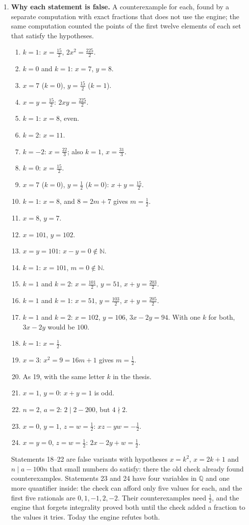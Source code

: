 \documentclass[11pt,a4paper]{article}
\begin{document}
\begin{enumerate}
\item \textbf{Why each statement is false.} A counterexample for each, found by a separate computation with exact fractions that does not use the engine; the same computation counted the points of the first twelve elements of each set that satisfy the hypotheses.
\begin{enumerate}
\item $k = 1$: $x = \frac{15}{2}$, $2x^{2} = \frac{225}{2}$.
\item $k = 0$ and $k = 1$: $x = 7$, $y = 8$.
\item $x = 7$ ($k = 0$), $y = \frac{15}{2}$ ($k = 1$).
\item $x = y = \frac{15}{2}$: $2xy = \frac{225}{2}$.
\item $k = 1$: $x = 8$, even.
\item $k = 2$: $x = 11$.
\item $k = -2$: $x = \frac{22}{3}$; also $k = 1$, $x = \frac{31}{3}$.
\item $k = 0$: $x = \frac{15}{2}$.
\item $x = 7$ ($k = 0$), $y = \frac{1}{2}$ ($k = 0$): $x + y = \frac{15}{2}$.
\item $k = 1$: $x = 8$, and $8 = 2m + 7$ gives $m = \frac{1}{2}$.
\item $x = 8$, $y = 7$.
\item $x = 101$, $y = 102$.
\item $x = y = 101$: $x - y = 0 \notin \mathbb{N}$.
\item $k = 1$: $x = 101$, $m = 0 \notin \mathbb{N}$.
\item $k = 1$ and $k = 2$: $x = \frac{101}{2}$, $y = 51$, $x + y = \frac{203}{2}$.
\item $k = 1$ and $k = 1$: $x = 51$, $y = \frac{103}{2}$, $x + y = \frac{205}{2}$.
\item $k = 1$ and $k = 2$: $x = 102$, $y = 106$, $3x - 2y = 94$. With one $k$ for both, $3x - 2y$ would be $100$.
\item $k = 1$: $x = \frac{1}{2}$.
\item $x = 3$: $x^{2} = 9 = 16m + 1$ gives $m = \frac{1}{2}$.
\item As 19, with the same letter $k$ in the thesis.
\item $x = 1$, $y = 0$: $x + y = 1$ is odd.
\item $n = 2$, $a = 2$: $2 \mid 2 - 200$, but $4 \nmid 2$.
\item $x = 0$, $y = 1$, $z = w = \frac{1}{2}$: $xz - yw = -\frac{1}{2}$.
\item $x = y = 0$, $z = w = \frac{1}{2}$: $2x - 2y + w = \frac{1}{2}$.
\end{enumerate}
Statements 18--22 are false variants with hypotheses $x = k^{2}$, $x = 2k + 1$ and $n \mid a - 100n$ that small numbers do satisfy: there the old check already found counterexamples. Statements 23 and 24 have four variables in $\mathbb{Q}$ and one more quantifier inside: the check can afford only five values for each, and the first five rationals are $0, 1, -1, 2, -2$. Their counterexamples need $\frac{1}{2}$, and the engine that forgets integrality proved both until the check added a fraction to the values it tries. Today the engine refutes both.


\end{enumerate}
\end{document}
